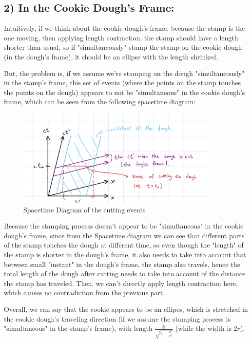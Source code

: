 \documentclass{article}
\begin{document}
\subsection*{2) In the Cookie Dough's Frame:}
Intuitively, if we think about the cookie dough's frame, because the stamp is the one moving, then applying length contraction, the stamp should have a length shorter than usual, so if "simultaneously" stamp the stamp on the cookie dough (in the dough's frame), it should be an ellipse with the length shrinked.

But, the problem is, if we assume we're stamping on the dough "simultaneously" in the stamp's frame, this set of events (where the points on the stamp touches the points on the dough) appears to not be "simultaneous" in the cookie dough's frame, which can be seen from the following spacetime diagram:

\begin{figure}[h!]
    \begin{center}
        \includegraphics[width=100mm]{hw4 q32.jpg}
        \caption{Spacetime Diagram of the cutting events}
    \end{center}
\end{figure}

Because the stamping process doesn't appear to be "simultaneous" in the cookie dough's frame, since from the Spacetime diagram we can see that different parts of the stamp touches the dough at different time, so even though the "length" of the stamp is shorter in the dough's frame, it also needs to take into account that between small "instant" in the dough's frame, the stamp also travels, hence the total length of the dough after cutting needs to take into account of the distance the stamp has traveled. Then, we can't directly apply length contraction here, which causes no contradiction from the previous part.

\hfil

Overall, we can say that the cookie appears to be an ellipes, which is stretched in the cookie dough's traveling direction (if we assume the stamping process is "simultaneous" in the stamp's frame), with length $\frac{2r}{\sqrt{1-\frac{v^2}{c^2}}}$ (while the width is $2r$).
\end{document}
